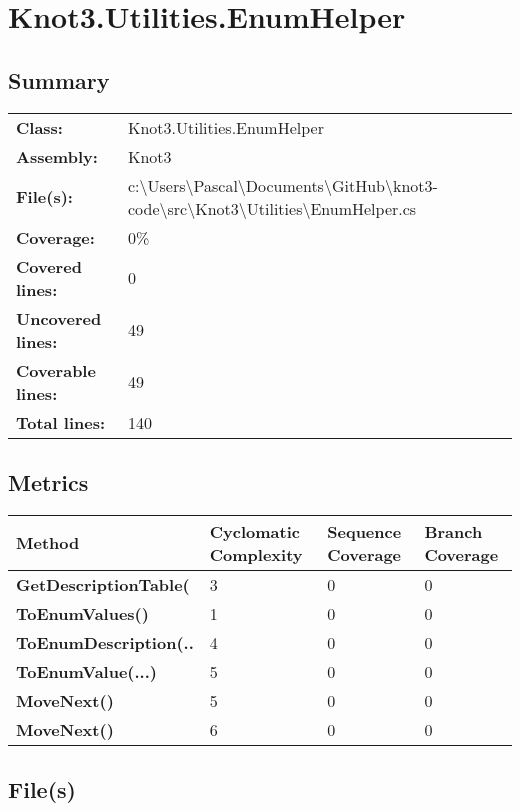 \documentclass[a4paper,10pt]{article}
\begin{document}
\section{Knot3.Utilities.EnumHelper}
\subsection{Summary}
\begin{longtable}[l]{ll}
\textbf{Class:} & Knot3.Utilities.EnumHelper\\
\textbf{Assembly:} & Knot3\\
\textbf{File(s):} & \begin{minipage}[t]{12cm}{c:\textbackslash Users\textbackslash Pascal\textbackslash Documents\textbackslash GitHub\textbackslash knot3-code\textbackslash src\textbackslash Knot3\textbackslash Utilities\textbackslash EnumHelper.cs}\end{minipage} \\
\textbf{Coverage:} & 0\%\\
\textbf{Covered lines:} & 0\\
\textbf{Uncovered lines:} & 49\\
\textbf{Coverable lines:} & 49\\
\textbf{Total lines:} & 140\\
\end{longtable}
\subsection{Metrics}
\begin{longtable}[l]{|l|l|l|l|}
\hline
\textbf{Method} & \textbf{Cyclomatic Complexity} & \textbf{Sequence Coverage} & \textbf{Branch Coverage}\\
\hline
\textbf{GetDescriptionTable(} & 3 & 0 & 0\\
\hline
\textbf{ToEnumValues()} & 1 & 0 & 0\\
\hline
\textbf{ToEnumDescription(..} & 4 & 0 & 0\\
\hline
\textbf{ToEnumValue(...)} & 5 & 0 & 0\\
\hline
\textbf{MoveNext()} & 5 & 0 & 0\\
\hline
\textbf{MoveNext()} & 6 & 0 & 0\\
\hline
\end{longtable}
\subsection{File(s)}
\end{document}
